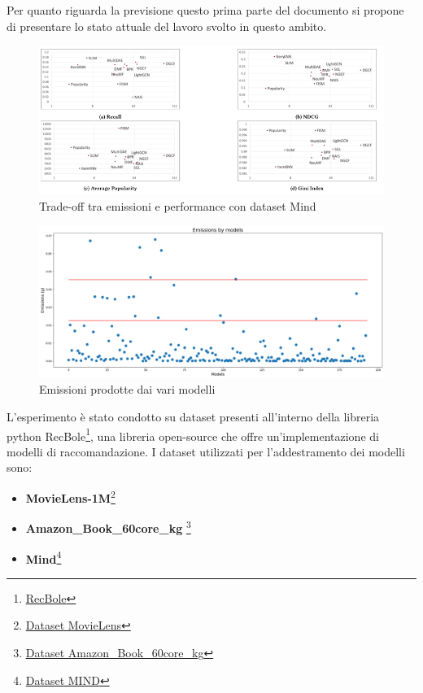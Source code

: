 \noindent Per quanto riguarda la previsione questo prima parte del documento si propone di presentare lo stato attuale del lavoro svolto in questo ambito.

\begin{figure}[H]
    \centering
    \includegraphics[scale=0.75]{images/risultati-valutazione.png}
    \caption{Trade-off tra emissioni e performance con dataset Mind}


\end{figure}



\begin{figure}[H]
    \centering
    \includegraphics[scale=0.25]{images/situazione-attuale.png}
    \caption{Emissioni prodotte dai vari modelli}
\end{figure}

\noindent L'esperimento è stato condotto su dataset presenti all'interno della libreria python RecBole\footnote{\href{http://recbole.io}{RecBole}}{}, una libreria open-source che offre un'implementazione di modelli di raccomandazione. I dataset utilizzati per l'addestramento dei modelli sono:
\begin{itemize}
    \item \textbf{MovieLens-1M}\footnote{\href{https://github.com/RUCAIBox/RecSysDatasets/blob/master/conversion_tools/usage/MovieLens.md}{Dataset MovieLens}}{}
    \item \textbf{Amazon\_Book\_60core\_kg} \footnote{\href{https://github.com/RUCAIBox/RecSysDatasets/blob/master/conversion_tools/usage/Amazon-book-KG.md}{Dataset Amazon\_Book\_60core\_kg}}{}
    \item \textbf{Mind}\footnote{\href{https://github.com/RUCAIBox/RecSysDatasets/blob/master/conversion_tools/usage/MIND.md}{Dataset MIND}}{}
\end{itemize}



